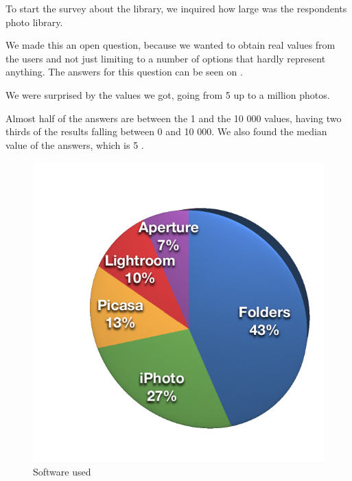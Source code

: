 To start the survey about the library, we inquired how large was the respondents photo library.

We made this an open question, because we wanted to obtain real values from the users and not just limiting to a number of options that hardly represent anything. The answers for this question can be seen on .

We were surprised by the values we got, going from 5 up to a million photos.

Almost half of the answers are between the 1  and the 10 000 values, having two thirds of the results falling between 0 and 10 000. We also found the median value of the answers, which is 5 .



\vspace{3\baselineskip}

\begin{figure}
	\vspace{-20pt}
	\begin{center}
		\includegraphics[width=\linewidth]{Figures/survey/sw}
	\end{center}
	\vspace{-20pt}
	\caption{Software used}
	\vspace{-5pt}
	\label{fig:us:desc}
\end{figure}

